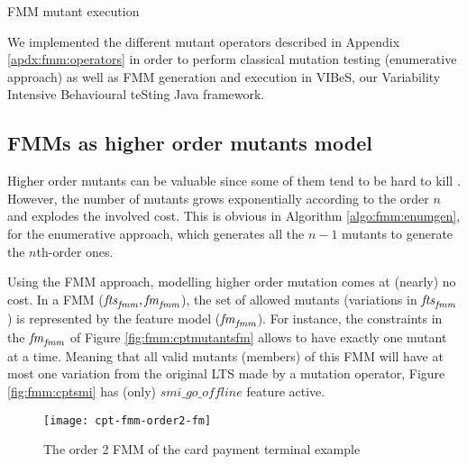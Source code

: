 \begin{algorithm}
	\caption{FMM mutant execution}
 \label{algo:fmm:livefmm}
\end{algorithm}

We implemented the different mutant operators described in Appendix \ref{apdx:fmm:operators} in order to perform classical mutation testing (enumerative approach) as well as FMM generation and execution in VIBeS, our Variability Intensive Behavioural teSting Java framework.


\subsection{FMMs as higher order mutants model}

Higher order mutants can be valuable since some of them tend to be hard to kill \cite{Harman2014}. However, the number of mutants grows exponentially according to the order $n$ and explodes the involved cost. This is obvious in Algorithm \ref{algo:fmm:enumgen}, for the enumerative approach, which generates all the $n-1$ mutants to generate the $n$th-order ones.

Using the FMM approach, modelling higher order mutation comes at (nearly) no cost. In a FMM ($\mathit{fts}_{\mathit{fmm}}, \mathit{fm}_{\mathit{fmm}}$), the set of allowed mutants (\ie variations in $\mathit{fts}_{\mathit{fmm}}$) is represented by the feature model ($\mathit{fm}_{\mathit{fmm}}$). For instance, the constraints in the $\mathit{fm}_{\mathit{fmm}}$ of Figure \ref{fig:fmm:cptmutantsfm} allows to have exactly one mutant at a time. Meaning that all valid mutants (members) of this FMM will have at most one variation from the original LTS made by a mutation operator, \eg Figure \ref{fig:fmm:cptsmi} has (only) $\mathit{smi\_go\_offline}$ feature active. 

\begin{figure}[h]
	\centering
	\texttt{[image: cpt-fmm-order2-fm]}
	\caption{The order 2 FMM of the card payment terminal example}
	\label{fig:fmm:order2fmm}
\end{figure}

